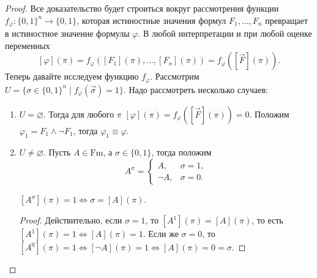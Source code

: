 \documentclass[a4paper, fleqn]{article}
\begin{document}
    \begin{proof}
        Все доказательство будет строиться вокруг рассмотрения функции $f_{\varphi} \colon 
        \{0, 1\}^{n} \to \{0, 1\}$, которая истиностные значения формул $F_{1}, 
        \ldots, F_{n}$ превращает в истиностное значение формулы $\varphi$.
        В любой интерпретации и при любой оценке переменных
        \[
            [\varphi](\pi) = f_{\varphi}([F_{1}](\pi), \ldots, [F_{n}](\pi)) = 
            f_{\varphi}([\vec{F}](\pi)).
        \]
        Теперь давайте исследуем функцию $f_{\varphi}$.
        Рассмотрим $U = \{\sigma \in \{0, 1\}^{n} \mid f_{\varphi}(\vec{\sigma}) = 1\}$.
        Надо рассмотреть несколько случаев:
        \begin{enumerate}
            \item $U = \varnothing$.
            Тогда для любого $\pi$ $[\varphi](\pi) = f_{\varphi}([\vec{F}](\pi)) = 0$.
            Положим $\varphi_{1} = F_{1} \land \neg F_{1}$, тогда $\varphi_{1} \equiv \varphi$.
            \item $U \neq \varnothing$.
            Пусть $A \in \text{Fm}$, а $\sigma \in \{0, 1\}$, тогда положим
            \[
                A^{\sigma} = 
                \begin{cases}
                    A, & \sigma = 1, \\
                    \neg A, & \sigma = 0.
                \end{cases}
            \]
            \begin{proposal}
                $[A^{\sigma}](\pi) = 1 \iff \sigma = [A](\pi)$.
            \end{proposal}
            \begin{proof}
                Действительно, если $\sigma = 1$, то $[A^{1}](\pi) = [A](\pi)$, то есть
                 $[A^{1}](\pi) = 1 \iff [A](\pi) = 1$.
                Если же $\sigma = 0$, то $[A^{0}](\pi) = 1 \iff [\neg A](\pi) = 1 \iff 
                [A](\pi) = 0 = \sigma$.
            \end{proof}
            \begin{corollary} 


\end{corollary}
\end{enumerate}
\end{proof}
\end{document}
